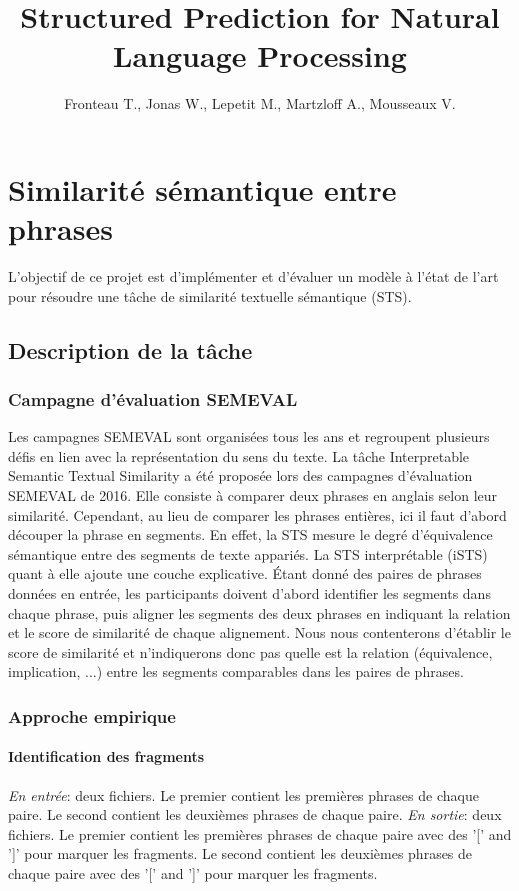 \documentclass[a4paper, twoside, 11pt]{article}
\title{Structured Prediction for Natural Language Processing}
\author{Fronteau T., Jonas W., Lepetit M., Martzloff A., Mousseaux V.}
\begin{document}
 \maketitle
 \section{Similarité sémantique entre phrases}
    L'objectif de ce projet est d'implémenter et d'évaluer un modèle à l’état de l’art pour résoudre une tâche de similarité textuelle sémantique (STS).

    \subsection{Description de la tâche}

        \subsubsection{Campagne d’évaluation SEMEVAL}

    Les campagnes SEMEVAL sont organisées tous les ans et regroupent plusieurs défis en lien avec la représentation du sens du texte. La tâche Interpretable Semantic Textual Similarity a été proposée lors des campagnes d’évaluation SEMEVAL de 2016. Elle consiste à comparer deux phrases en anglais selon leur similarité. Cependant, au lieu de comparer les phrases entières, ici il faut d’abord découper la phrase en segments. En effet, la STS mesure le degré d'équivalence sémantique entre des segments de texte appariés. La STS interprétable (iSTS) quant à elle ajoute une couche explicative. Étant donné des paires de phrases données en entrée, les participants doivent d'abord identifier les segments dans chaque phrase, puis aligner les segments des deux phrases en indiquant la relation et le score de similarité de chaque alignement. Nous nous contenterons d'établir le score de similarité et n'indiquerons donc pas quelle est la relation (équivalence, implication, ...) entre les segments comparables dans les paires de phrases.

        \subsubsection{Approche empirique}

    \paragraph{Identification des fragments}
    \hfill \break
    \textit{En entrée}: deux fichiers. Le premier contient les premières phrases de chaque paire. Le second contient les deuxièmes phrases de chaque paire. \hfill \break
    \textit{En sortie}: deux fichiers. Le premier contient les premières phrases de chaque paire avec des '[' and ']' pour marquer les fragments. Le second contient les deuxièmes phrases de chaque paire avec des '[' and ']' pour marquer les fragments.
\end{document}
